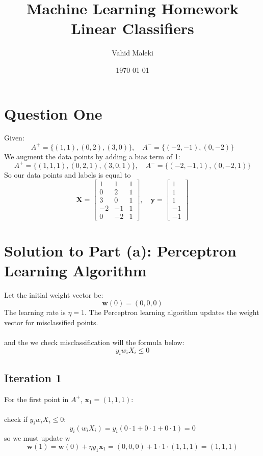 \documentclass[a4paper, 11pt]{article}
\title{Machine Learning Homework Linear Classifiers}
\author{Vahid Maleki}
\date{\today}
\begin{document}
	\maketitle
	\section{Question One}
	Given:
	\[
	A^+ = \{(1, 1), (0, 2), (3, 0)\}, \quad A^- = \{(-2, -1), (0, -2)\}
	\]
	We augment the data points by adding a bias term of 1:
	\[
	A^+ = \{(1, 1, 1), (0, 2, 1), (3, 0, 1)\}, \quad A^- = \{(-2, -1, 1), (0, -2, 1)\}
	\]
	So our data points and labels is equal to
	\[
	\mathbf{X} = 
	\begin{bmatrix}
		1 & 1 & 1 \\
		0 & 2 & 1 \\
		3 & 0 & 1 \\
		-2 & -1 & 1 \\
		0 & -2 & 1
	\end{bmatrix}, \quad
	\mathbf{y} = 
	\begin{bmatrix}
		1 \\
		1 \\
		1 \\
		-1 \\
		-1
	\end{bmatrix}
	\]
	
	\section*{Solution to Part (a): Perceptron Learning Algorithm}
	
	Let the initial weight vector be:
	\[
	\mathbf{w}(0) = (0, 0, 0)
	\]
	The learning rate is $\eta = 1$. The Perceptron learning algorithm updates the weight vector for misclassified points.
	\\\\
	and the we check misclassification will the formula below:
	\[
	y_i w_i X_i \le 0
	\]
	
	\subsection*{Iteration 1}
	For the first point in $A^+$, $\mathbf{x}_1 = (1, 1, 1)$:
	\\\\
	check if \(y_i w_i X_i \le 0\):
	\[
	y_i (w_i X_i) = y_i (0\cdot1 + 0\cdot1 + 0\cdot1) = 0
	\]
	so we must update w
	\[
	\mathbf{w}(1) = \mathbf{w}(0) + \eta y_1 \mathbf{x}_1 = (0, 0, 0) + 1 \cdot 1 \cdot(1, 1, 1) = (1, 1, 1)
	\]
	
\end{document}
